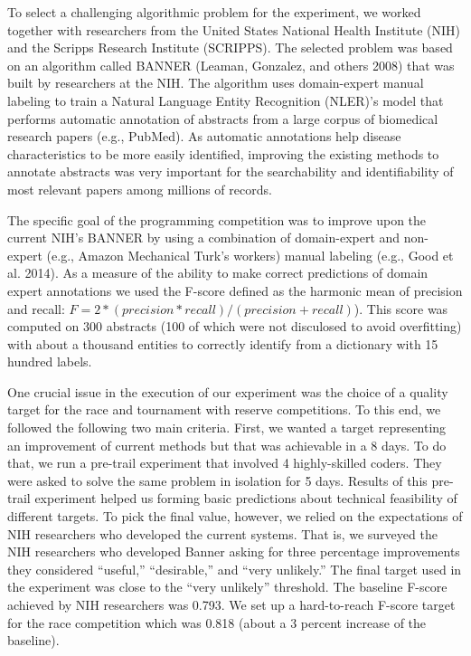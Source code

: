 \documentclass[11pt, titlepage]{article}
\begin{document}
To select a challenging algorithmic problem for the experiment, we
worked together with researchers from the United States National Health
Institute (NIH) and the Scripps Research Institute (SCRIPPS). The
selected problem was based on an algorithm called BANNER (Leaman,
Gonzalez, and others 2008) that was built by researchers at the NIH. The
algorithm uses domain-expert manual labeling to train a Natural Language
Entity Recognition (NLER)'s model that performs automatic annotation of
abstracts from a large corpus of biomedical research papers (e.g.,
PubMed). As automatic annotations help disease characteristics to be
more easily identified, improving the existing methods to annotate
abstracts was very important for the searchability and identifiability
of most relevant papers among millions of records.

The specific goal of the programming competition was to improve upon the
current NIH's BANNER by using a combination of domain-expert and
non-expert (e.g., Amazon Mechanical Turk's workers) manual labeling
(e.g., Good et al. 2014). As a measure of the ability to make correct
predictions of domain expert annotations we used the F-score defined as
the harmonic mean of precision and recall:
\(F = 2 * (precision * recall) / (precision + recall)\)). This score was
computed on 300 abstracts (100 of which were not disculosed to avoid
overfitting) with about a thousand entities to correctly identify from a
dictionary with 15 hundred labels.

One crucial issue in the execution of our experiment was the choice of a
quality target for the race and tournament with reserve competitions. To
this end, we followed the following two main criteria. First, we wanted
a target representing an improvement of current methods but that was
achievable in a 8 days. To do that, we run a pre-trail experiment that
involved 4 highly-skilled coders. They were asked to solve the same
problem in isolation for 5 days. Results of this pre-trail experiment
helped us forming basic predictions about technical feasibility of
different targets. To pick the final value, however, we relied on the
expectations of NIH researchers who developed the current systems. That
is, we surveyed the NIH researchers who developed Banner asking for
three percentage improvements they considered ``useful,'' ``desirable,''
and ``very unlikely.'' The final target used in the experiment was close
to the ``very unlikely'' threshold. The baseline F-score achieved by NIH
researchers was 0.793. We set up a hard-to-reach F-score target for the
race competition which was 0.818 (about a 3 percent increase of the
baseline).
\end{document}
